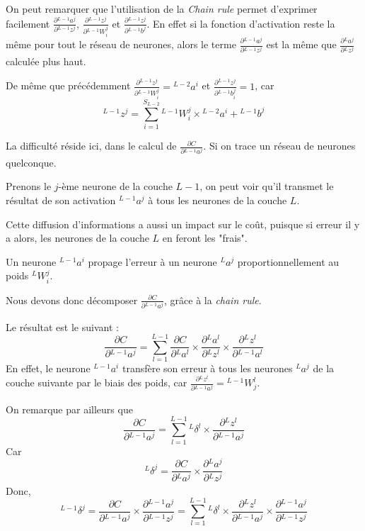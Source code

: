 \documentclass[a4paper, 10pt]{report}
\newcommand{\lexp}[1]{\phantom{}^{#1}}
\newcommand{\elem}[4]{\lexp{#2}#1^{#3}_{#4}}
\begin{document}
On peut remarquer que l'utilisation de la \emph{Chain rule} permet d'exprimer facilement $\frac{\partial \elem{a}{L-1}{j}{}}{\partial \elem{z}{L-1}{j}{}}$, $\frac{\partial \elem{z}{L-1}{j}{}}{\partial \elem{W}{L-1}{j}{i}}$ et $\frac{\partial \elem{z}{L-1}{j}{}}{\partial \elem{b}{L-1}{j}{}}$.
En effet si la fonction d'activation reste la même pour tout le réseau de neurones, alors le terme $\frac{\partial \elem{a}{L-1}{j}{}}{\partial \elem{z}{L-1}{j}{}}$ est la même que $\frac{\partial \elem{a}{L}{j}{}}{\partial \elem{z}{L}{j}{}}$ calculée plus haut.

De même que précédemment $\frac{\partial \elem{z}{L-1}{j}{}}{\partial \elem{W}{L-1}{j}{i}}=\elem{a}{L-2}{i}{}$ et $\frac{\partial \elem{z}{L-1}{j}{}}{\partial \elem{b}{L-1}{j}{i}} = 1$, car
$$\elem{z}{L-1}{j}{} = \sum_{i=1}^{S_{L-2}}{\elem{W}{L-1}{j}{i} \times \elem{a}{L-2}{i}{}} + \elem{b}{L-1}{j}{}$$
				
La difficulté réside ici, dans le calcul de $\frac{\partial C}{\partial \elem{a}{L-1}{j}{}}$.
Si on trace un réseau de neurones quelconque.

Prenons le $j$-ème neurone de la couche $L-1$, on peut voir qu'il transmet le résultat de son activation $\elem{a}{L-1}{j}{}$ à tous les neurones de la couche $L$.

Cette diffusion d'informations a aussi un impact sur le coût, puisque si erreur il y a alors, les neurones de la couche $L$ en feront les "frais".

Un neurone $\elem{a}{L-1}{i}{}$ propage l'erreur à un neurone $\elem{a}{L}{j}{}$ proportionnellement au poids $\elem{W}{L}{j}{i}$.
				
Nous devons donc décomposer $\frac{\partial C}{\partial \elem{a}{L-1}{j}{}}$, grâce à la \emph{chain rule}.
				
Le résultat est le suivant :	
$$\frac{\partial C}{\partial \elem{a}{L-1}{j}{}} = \sum_{l=1}^{L-1}{\frac{\partial C}{\partial \elem{a}{L}{l}{}} \times \frac{\partial \elem{a}{L}{l}{}}{\partial \elem{z}{L}{l}{}} \times \frac{\partial \elem{z}{L}{l}{}}{\partial \elem{a}{L-1}{l}{}}}$$
En effet, le neurone $\elem{a}{L-1}{i}{}$ transfère son erreur à tous les neurones $\elem{a}{L}{j}{}$ de la couche suivante par le biais des poids, car $\frac{\partial \elem{z}{L}{l}{}}{\partial \elem{a}{L-1}{j}{}} = \elem{W}{L-1}{l}{j}$.

On remarque par ailleurs que 
$$\frac{\partial C}{\partial \elem{a}{L-1}{j}{}} = \sum_{l=1}^{L-1}{\elem{\delta}{L}{l}{} \times \frac{\partial \elem{z}{L}{l}{}}{\partial \elem{a}{L-1}{j}{}}}$$
Car $$\elem{\delta}{L}{j}{} = \frac{\partial C}{\partial \elem{a}{L}{j}{}} \times \frac{\partial \elem{a}{L}{j}{}}{\partial \elem{z}{L}{j}{}}$$
Donc,
$$\elem{\delta}{L-1}{j}{} = \frac{\partial C}{\partial \elem{a}{L-1}{j}{}}  \times \frac{\partial \elem{a}{L-1}{j}{}}{\partial \elem{z}{L-1}{j}{}} = \sum_{l=1}^{L-1}{\elem{\delta}{L}{l}{} \times \frac{\partial \elem{z}{L}{l}{}}{\partial \elem{a}{L-1}{j}{}}} \times \frac{\partial \elem{a}{L-1}{j}{}}{\partial \elem{z}{L-1}{j}{}}$$
				
\end{document}
